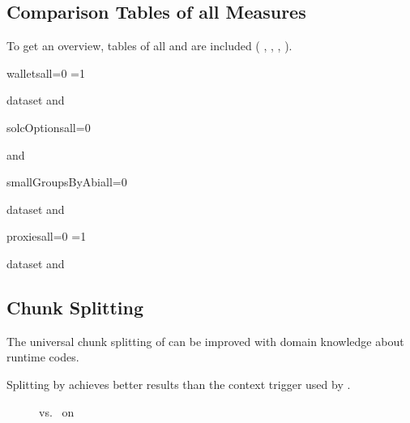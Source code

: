 \documentclass[../main.tex]{subfiles}
\begin{document}
\subsection{Comparison Tables of all Measures}

To get an overview, tables of all  and  are included ( , \n{\solcts} ,  ,  ).

\begin{sepTbl}{wallets}{all}{=0 \or {}=1}
  \caption{ dataset  and }
  \label{tbl:wallet_sep}
\end{sepTbl}

\begin{sepTbl}{solcOptions}{all}{=0}
  \caption{\n{\solcts}  and }
  \label{tbl:solc_sep}
\end{sepTbl}

\begin{sepTbl}{smallGroupsByAbi}{all}{=0}
  \caption{ dataset  and }
  \label{tbl:smallGroupsByAbi}
\end{sepTbl}

\begin{sepTbl}{proxies}{all}{=0 \or {}=1}
  \caption{ dataset  and }
  \label{tbl:proxies_sep}
\end{sepTbl}

\subsection{Chunk Splitting}
\begin{hyp}
  The universal chunk splitting of  can be improved with domain knowledge about  runtime codes.
\end{hyp}
\begin{res}
  Splitting by  achieves better results than the context trigger used by   .
\end{res}

\begin{figure}[ht!]
  \centering
  \caption{ vs.\  on }
  \label{fig:walletsJumpPpHist}
\end{figure}
\end{document}

